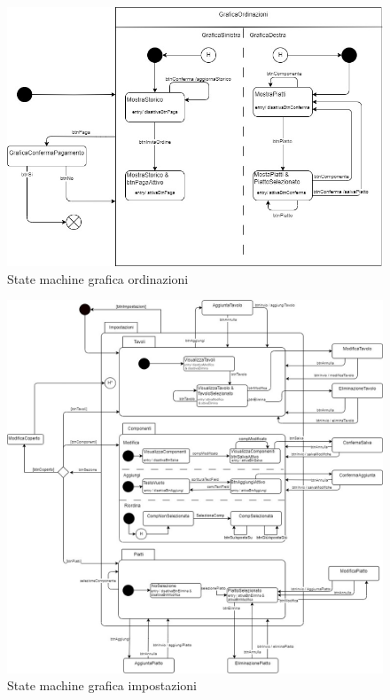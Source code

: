 \documentclass[12pt, letterpaper]{book}
\begin{document}
\begin{figure}[H]
    \centering
    \includegraphics[width =0.8 \linewidth]{../UML/DrawIo/StateMachine/StateMachine-GraficaOrdinazioni.jpg}
    \caption{State machine grafica ordinazioni}
    \label{UML: SM-GraficaOrdinazioni}
\end{figure}
\begin{figure}[H]
    \centering
    \includegraphics[width =1 \linewidth]{../UML/DrawIo/StateMachine/StateMachine-GraficaImpostazioni.jpg}
    \caption{State machine grafica impostazioni}
    \label{UML: SM-GraficaImpostazioni}
\end{figure}

\newpage
\end{document}
